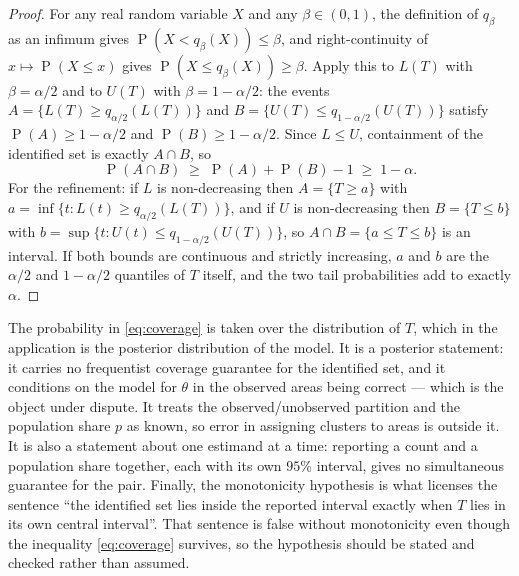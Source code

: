 \begin{proof}
For any real random variable $X$ and any $\beta \in (0,1)$, the definition of
$q_\beta$ as an infimum gives $\operatorname{P}(X < q_\beta(X)) \le \beta$, and
right-continuity of $x \mapsto \operatorname{P}(X \le x)$ gives
$\operatorname{P}(X \le q_\beta(X)) \ge \beta$.  Apply this to $L(T)$ with
$\beta=\alpha/2$ and to $U(T)$ with $\beta=1-\alpha/2$: the events
$A=\{L(T) \ge q_{\alpha/2}(L(T))\}$ and
$B=\{U(T) \le q_{1-\alpha/2}(U(T))\}$ satisfy
$\operatorname{P}(A) \ge 1-\alpha/2$ and
$\operatorname{P}(B) \ge 1-\alpha/2$.  Since $L \le U$, containment of the
identified set is exactly $A \cap B$, so
\[
  \operatorname{P}(A \cap B) \;\ge\; \operatorname{P}(A) + \operatorname{P}(B) - 1
  \;\ge\; 1-\alpha .
\]
For the refinement: if $L$ is non-decreasing then $A=\{T \ge a\}$ with
$a=\inf\{t : L(t) \ge q_{\alpha/2}(L(T))\}$, and if $U$ is non-decreasing then
$B=\{T \le b\}$ with $b=\sup\{t: U(t) \le q_{1-\alpha/2}(U(T))\}$, so
$A\cap B = \{a \le T \le b\}$ is an interval.  If both bounds are continuous
and strictly increasing, $a$ and $b$ are the $\alpha/2$ and $1-\alpha/2$
quantiles of $T$ itself, and the two tail probabilities add to exactly
$\alpha$.
\end{proof}

\begin{remark}
\label{rem:p3limits}
The probability in \eqref{eq:coverage} is taken over the distribution of $T$,
which in the application is the posterior distribution of the model.  It is a
posterior statement: it carries no frequentist coverage guarantee for the
identified set, and it conditions on the model for $\theta$ in the observed
areas being correct --- which is the object under dispute.  It treats the
observed/unobserved partition and the population share $p$ as known, so error
in assigning clusters to areas is outside it.  It is also a statement about one
estimand at a time: reporting a count and a population share together, each
with its own $95\%$ interval, gives no simultaneous guarantee for the pair.
Finally, the monotonicity hypothesis is what licenses the sentence ``the
identified set lies inside the reported interval exactly when $T$ lies in its
own central interval''.  That sentence is false without monotonicity even
though the inequality \eqref{eq:coverage} survives, so the hypothesis should be
stated and checked rather than assumed.
\end{remark}

